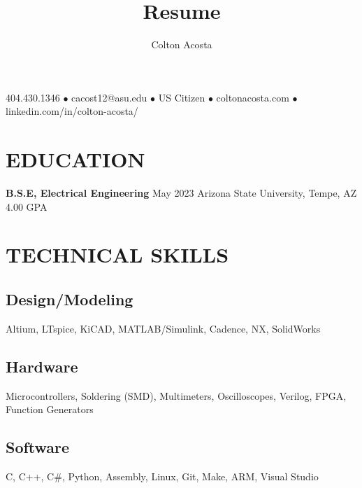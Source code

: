\documentclass{article}
\makeatletter
\renewcommand{\maketitle}{
	\begin{center}
		{\huge\bfseries
			\theauthor}
			
		404.430.1346 $\bullet$ cacost12@asu.edu $\bullet$ US Citizen $\bullet$ coltonacosta.com $\bullet$ linkedin.com/in/colton-acosta/
	\end{center}
}
\makeatother
\begin{document}
\title{Resume}
\author{Colton Acosta}
\maketitle
\section{EDUCATION}
\textbf{B.S.E, Electrical Engineering}
\hfill 
May 2023
\linebreak
Arizona State University, Tempe, AZ 
\hfill
4.00 GPA

\section{TECHNICAL SKILLS}
\subsection{Design/Modeling}
Altium, LTspice, KiCAD, MATLAB/Simulink, Cadence, NX, SolidWorks 
\subsection{Hardware}
Microcontrollers, Soldering (SMD), Multimeters, Oscilloscopes, Verilog, FPGA, Function Generators 
\subsection{Software} 
C, C++, C\#, Python, Assembly, Linux, Git, Make, ARM, Visual Studio 
\end{document}
